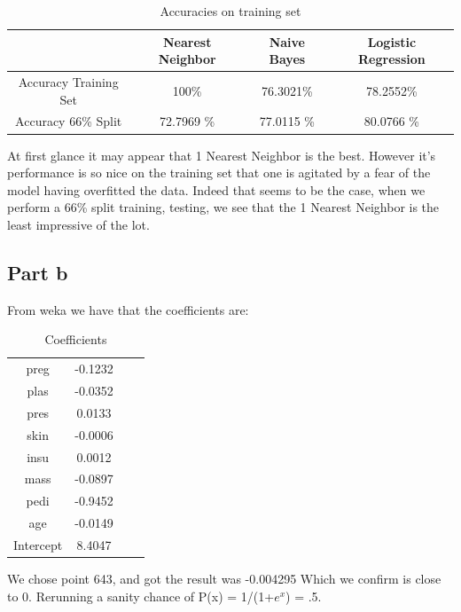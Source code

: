 \documentclass{article}
\begin{document}
\begin{table}[H]
    \begin{center}
    \caption{Accuracies on training set}
    \begin{tabular}{|c|c|c|c|}
   \hline
        & Nearest Neighbor & Naive Bayes & Logistic Regression \\ \hline
         Accuracy Training Set &  100\%&76.3021\% & 78.2552\%   \\ \hline
         Accuracy 66\% Split &  72.7969 \% &77.0115 \% & 80.0766 \% \\\hline
             
     
    \end{tabular}
    \end{center}
\end{table}

At first glance it may appear that 1 Nearest Neighbor is the best. However it's performance is so nice on the training set that one is agitated by a fear of the model having overfitted the data. Indeed that seems to be the case, when we perform a 66\% split training, testing, we see that the 1 Nearest Neighbor is the least impressive of the lot. 

\subsection{Part b}
From weka we have that the coefficients are: 

\begin{table}[H]
 \caption{Coefficients}
    \begin{center}
    \begin{tabular}{|c|c|c|c|}
   \hline
preg          &       -0.1232\\
plas             &    -0.0352\\
pres               &   0.0133\\
skin              &   -0.0006\\
insu               &   0.0012\\
mass              &   -0.0897\\
pedi             &    -0.9452\\
age            &      -0.0149\\
Intercept      &       8.4047\\ %
\hline
    \end{tabular}
    \end{center}
\end{table}

We chose point 643, and got the result was -0.004295 Which we confirm is close to 0. Rerunning a sanity chance of P(x) = 1/(1+$e^x$) = .5. 
\end{document}
